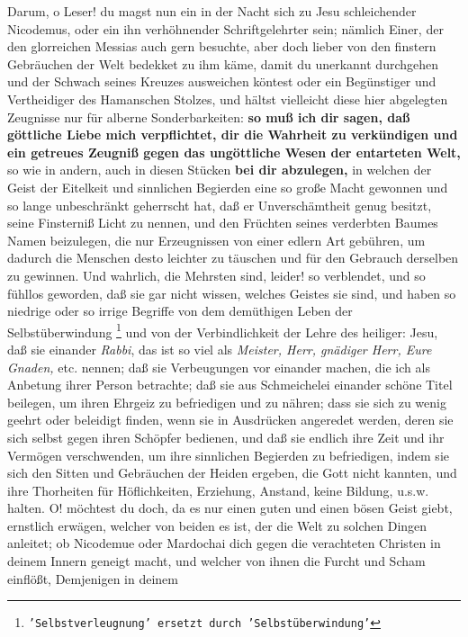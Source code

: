 Darum, o Leser! du magst nun ein in der Nacht sich zu Jesu schleichender
Nicodemus, oder ein ihn verhöhnender Schriftgelehrter sein; nämlich Einer, der
den glorreichen Messias auch gern besuchte, aber doch lieber von den finstern
Gebräuchen der Welt bedekket zu ihm käme, damit du unerkannt durchgehen und der
Schwach seines Kreuzes ausweichen köntest oder ein Begünstiger und Vertheidiger
des Hamanschen Stolzes, und hältst vielleicht diese hier abgelegten Zeugnisse
nur für alberne Sonderbarkeiten: \textbf{so muß ich dir sagen, daß göttliche Liebe mich
verpflichtet, dir die Wahrheit zu verkündigen und ein getreues Zeugniß gegen das
ungöttliche Wesen der entarteten Welt,} so wie in andern, auch in diesen Stücken
\textbf{bei dir abzulegen,} in welchen der Geist der Eitelkeit und sinnlichen Begierden
eine so große Macht gewonnen und so lange unbeschränkt geherrscht hat, daß er
Unverschämtheit genug besitzt, seine Finsterniß Licht zu nennen, und den
Früchten seines verderbten Baumes Namen beizulegen, die nur Erzeugnissen von
einer edlern Art gebühren, um dadurch die Menschen desto leichter zu täuschen
und für den Gebrauch derselben zu gewinnen. Und wahrlich, die Mehrsten sind,
leider! so verblendet, und so fühllos geworden, daß sie gar nicht wissen,
welches Geistes sie sind, und haben so niedrige oder so irrige Begriffe von dem
demüthigen Leben der Selbstüberwindung
\footnote{\texttt{'Selbstverleugnung' ersetzt durch 'Selbstüberwindung'}} und von der Verbindlichkeit der Lehre des
heiliger: Jesu, daß sie einander \textit{Rabbi}, das ist so viel als \textit{Meister,
Herr, gnädiger Herr, Eure Gnaden,} etc. nennen; daß sie Verbeugungen vor
einander machen, die ich als Anbetung ihrer Person betrachte; daß sie aus
Schmeichelei einander schöne Titel beilegen, um ihren Ehrgeiz zu befriedigen und
zu nähren; dass sie sich zu wenig geehrt oder beleidigt finden, wenn sie in
Ausdrücken angeredet werden, deren sie sich selbst gegen ihren Schöpfer
bedienen, und daß sie endlich ihre Zeit und ihr Vermögen verschwenden, um ihre
sinnlichen Begierden zu befriedigen, indem sie sich den Sitten und Gebräuchen
der Heiden ergeben, die Gott nicht kannten, und ihre Thorheiten für
Höflichkeiten, Erziehung, Anstand, keine Bildung, u.s.w. halten. O! möchtest
du doch, da es nur einen guten und einen bösen Geist giebt, ernstlich erwägen,
welcher von beiden es ist, der die Welt zu solchen Dingen anleitet; ob Nicodemue
oder Mardochai dich gegen die verachteten Christen in deinem Innern geneigt
macht, und welcher von ihnen die Furcht und Scham einflößt, Demjenigen in deinem
